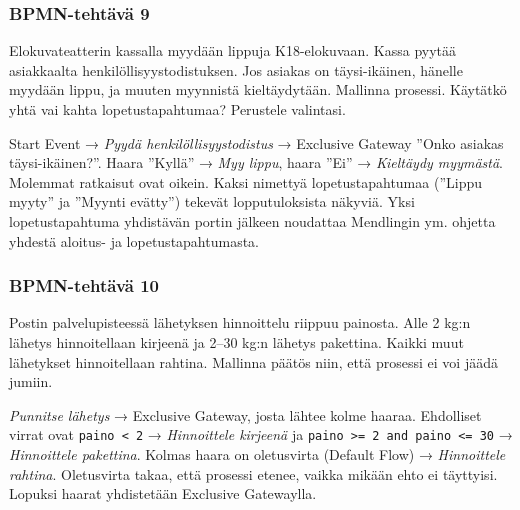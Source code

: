 \documentclass[
  finnish,
  letterpaper,
  DIV=11,
  numbers=noendperiod,
  oneside]{scrreprt}
\begin{document}
\subsubsection{BPMN-tehtävä 9}\label{bpmn-tehtuxe4vuxe4-9}

Elokuvateatterin kassalla myydään lippuja K18-elokuvaan. Kassa pyytää
asiakkaalta henkilöllisyystodistuksen. Jos asiakas on täysi-ikäinen,
hänelle myydään lippu, ja muuten myynnistä kieltäydytään. Mallinna
prosessi. Käytätkö yhtä vai kahta lopetustapahtumaa? Perustele
valintasi.

\begin{tcolorbox}[enhanced jigsaw, arc=.35mm, bottomrule=.15mm, bottomtitle=1mm, breakable, colback=white, colbacktitle=quarto-callout-tip-color!10!white, colframe=quarto-callout-tip-color-frame, coltitle=black, left=2mm, leftrule=.75mm, opacityback=0, opacitybacktitle=0.6, rightrule=.15mm, title=\textcolor{quarto-callout-tip-color}{\faLightbulb}\hspace{0.5em}{Malliratkaisu}, titlerule=0mm, toprule=.15mm, toptitle=1mm]

Start Event → \emph{Pyydä henkilöllisyystodistus} → Exclusive Gateway
''Onko asiakas täysi-ikäinen?''. Haara ''Kyllä'' → \emph{Myy lippu},
haara ''Ei'' → \emph{Kieltäydy myymästä}. Molemmat ratkaisut ovat
oikein. Kaksi nimettyä lopetustapahtumaa (''Lippu myyty'' ja ''Myynti
evätty'') tekevät lopputuloksista näkyviä. Yksi lopetustapahtuma
yhdistävän portin jälkeen noudattaa Mendlingin ym. ohjetta yhdestä
aloitus- ja lopetustapahtumasta.

\end{tcolorbox}

\subsubsection{BPMN-tehtävä 10}\label{bpmn-tehtuxe4vuxe4-10}

Postin palvelupisteessä lähetyksen hinnoittelu riippuu painosta. Alle 2
kg:n lähetys hinnoitellaan kirjeenä ja 2--30 kg:n lähetys pakettina.
Kaikki muut lähetykset hinnoitellaan rahtina. Mallinna päätös niin, että
prosessi ei voi jäädä jumiin.

\begin{tcolorbox}[enhanced jigsaw, arc=.35mm, bottomrule=.15mm, bottomtitle=1mm, breakable, colback=white, colbacktitle=quarto-callout-tip-color!10!white, colframe=quarto-callout-tip-color-frame, coltitle=black, left=2mm, leftrule=.75mm, opacityback=0, opacitybacktitle=0.6, rightrule=.15mm, title=\textcolor{quarto-callout-tip-color}{\faLightbulb}\hspace{0.5em}{Malliratkaisu}, titlerule=0mm, toprule=.15mm, toptitle=1mm]

\emph{Punnitse lähetys} → Exclusive Gateway, josta lähtee kolme haaraa.
Ehdolliset virrat ovat \texttt{paino\ \textless{}\ 2} →
\emph{Hinnoittele kirjeenä} ja
\texttt{paino\ \textgreater{}=\ 2\ and\ paino\ \textless{}=\ 30} →
\emph{Hinnoittele pakettina}. Kolmas haara on oletusvirta (Default Flow)
→ \emph{Hinnoittele rahtina}. Oletusvirta takaa, että prosessi etenee,
vaikka mikään ehto ei täyttyisi. Lopuksi haarat yhdistetään Exclusive
Gatewaylla.

\end{tcolorbox}
\end{document}
